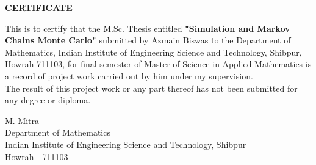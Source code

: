 \vspace{10cm}
\begin{center}
    \LARGE{\textbf{CERTIFICATE}}
\end{center}
\vspace*{2cm}
This is to certify that the M.Sc. Thesis entitled \textbf{"Simulation and Markov Chains Monte Carlo"} submitted by Azmain Biswas to the Department of Mathematics, Indian Institute of Engineering Science and Technology, Shibpur, Howrah-711103, for final semester of Master of Science in Applied Mathematics is a record of project work carried out by him under my supervision. \\
The result of this project work or any part thereof has not been submitted for any degree or diploma.
\vspace{4cm}
\begin{flushright}
    M. Mitra\\
    Department of Mathematics\\
    Indian Institute of Engineering Science and Technology, Shibpur \\ 
    Howrah - 711103
\end{flushright}
